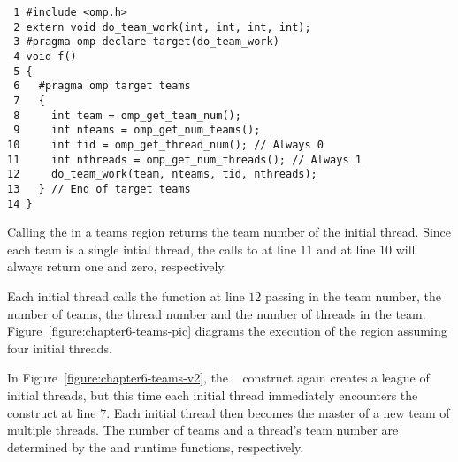 \begin{figure*}[!tb]
\begin{verbatim}
 1 #include <omp.h>
 2 extern void do_team_work(int, int, int, int);
 3 #pragma omp declare target(do_team_work)
 4 void f()
 5 {
 6   #pragma omp target teams
 7   {
 8     int team = omp_get_team_num();
 9     int nteams = omp_get_num_teams();
10     int tid = omp_get_thread_num(); // Always 0
11     int nthreads = omp_get_num_threads(); // Always 1
12     do_team_work(team, nteams, tid, nthreads);
13   } // End of target teams
14 }
\end{verbatim}
\caption{ \textbf {Example of the target teams construct } -- \small
          Multiple initial threads execute the function \texttt{do\_team\_work()}.     
         }
\label{figure:chapter6-teams-v1}
\end{figure*}

Calling the  in a teams region returns the team
number of the initial thread.  Since each team is a single intial thread, the calls to
 at line $11$ and  at line $10$
will always return one and zero, respectively. 

Each initial thread calls the function  at line $12$ passing in
the team number, the number of teams, the thread number and the number of threads in the
team.  Figure~\ref{figure:chapter6-teams-pic} diagrams the execution of the
region assuming four initial threads.

\begin{figure*}[!tbh]
\centering
{}
\caption{ \textbf{The target teams construct creates a league of initial 
               threads} -- \small
        Each initial thread is a team of one thread.  The inital threads
        execute the teams region in parallel.
        }
\label{figure:chapter6-teams-pic}
\end{figure*}

In Figure~\ref{figure:chapter6-teams-v2}, the ~ construct again
creates a league of initial threads, but this time each initial thread
immediately encounters the  construct at line $7$. Each initial thread then
becomes the master of a new team of multiple threads.  The number of teams and
a thread's team number are determined by the  and
 runtime functions, respectively.


